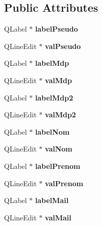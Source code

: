 \subsection*{Public Attributes}
\begin{DoxyCompactItemize}
\item 
Q\-Label $\ast$ {\bfseries label\-Pseudo}\label{class_ui___dialog_inscription_ad6cbb361ce390cc8ebf99e4774d5b21d}

\item 
Q\-Line\-Edit $\ast$ {\bfseries val\-Pseudo}\label{class_ui___dialog_inscription_a5893587115e987676400b0a5912ef6a8}

\item 
Q\-Label $\ast$ {\bfseries label\-Mdp}\label{class_ui___dialog_inscription_a3a3bb8c1384c3ddc6e30cce2d5f006be}

\item 
Q\-Line\-Edit $\ast$ {\bfseries val\-Mdp}\label{class_ui___dialog_inscription_aecfee6e95908c76088f926cc4273c661}

\item 
Q\-Label $\ast$ {\bfseries label\-Mdp2}\label{class_ui___dialog_inscription_a40577873306a0cff844f092596900be6}

\item 
Q\-Line\-Edit $\ast$ {\bfseries val\-Mdp2}\label{class_ui___dialog_inscription_aeaf99f06b2313bebaa084ff3b962b377}

\item 
Q\-Label $\ast$ {\bfseries label\-Nom}\label{class_ui___dialog_inscription_a37335311fc697d84e29041a28c0b3a16}

\item 
Q\-Line\-Edit $\ast$ {\bfseries val\-Nom}\label{class_ui___dialog_inscription_a5f1ec1d09785e1f5da1d3d436a9a4e00}

\item 
Q\-Label $\ast$ {\bfseries label\-Prenom}\label{class_ui___dialog_inscription_a90652e248fbff5e80d7ae7f465f3c67a}

\item 
Q\-Line\-Edit $\ast$ {\bfseries val\-Prenom}\label{class_ui___dialog_inscription_a9fcf8c25b58d8d186801291b351f71a6}

\item 
Q\-Label $\ast$ {\bfseries label\-Mail}\label{class_ui___dialog_inscription_aa8405fd8a2dba259c85174fbd1815025}

\item 
Q\-Line\-Edit $\ast$ {\bfseries val\-Mail}\label{class_ui___dialog_inscription_a620d0c3971f7a8134de43c5cb4141d0b}


\end{DoxyCompactItemize}
